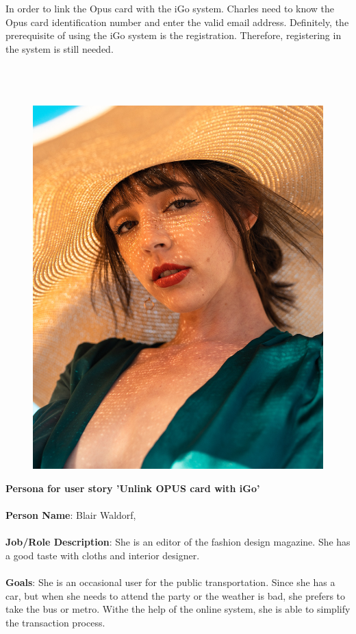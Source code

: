 \documentclass[11pt, english]{report}
\begin{document}
In order to link the Opus card with the iGo system. Charles need to know the Opus card identification number and enter the valid email address. Definitely, the prerequisite of using the iGo system is the registration. Therefore, registering in the system is still needed.
\\\\
\\\\
\begin{figure}
\includegraphics[width=0.9\linewidth]{images/woman_Editor.jpg} 
\label{fig:wrapfig}
\end{figure}
\textbf{Persona for user story 'Unlink OPUS card with iGo'}
\\\\
\textbf{Person Name}: Blair Waldorf, 
\\\\
\textbf{Job/Role Description}: She is an editor of the fashion design magazine. She has a good taste with cloths and interior designer.
\\\\
\textbf{Goals}: She is an occasional user for the public transportation. Since she has a car, but when she needs to attend the party or the weather is bad, she prefers to take the bus or metro. Withe the help of the online system, she is able to simplify the transaction process.
\end{document}
